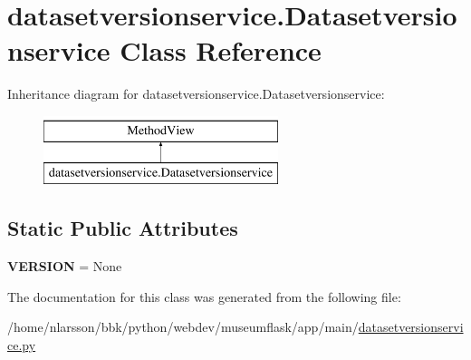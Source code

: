 \hypertarget{classdatasetversionservice_1_1Datasetversionservice}{}\section{datasetversionservice.\+Datasetversionservice Class Reference}
\label{classdatasetversionservice_1_1Datasetversionservice}
Inheritance diagram for datasetversionservice.\+Datasetversionservice\+:\begin{figure}[H]
\begin{center}
\leavevmode
\includegraphics[height=2.000000cm]{classdatasetversionservice_1_1Datasetversionservice}
\end{center}
\end{figure}
\subsection*{Static Public Attributes}
\begin{DoxyCompactItemize}
\item 
\mbox{\label{classdatasetversionservice_1_1Datasetversionservice_aff6d4e225687f1100d8be579c87d15b7}} 
{\bfseries V\+E\+R\+S\+I\+ON} = None
\end{DoxyCompactItemize}


The documentation for this class was generated from the following file\+:\begin{DoxyCompactItemize}
\item 
/home/nlarsson/bbk/python/webdev/museumflask/app/main/\mbox{\hyperlink{datasetversionservice_8py}{datasetversionservice.\+py}}\end{DoxyCompactItemize}
